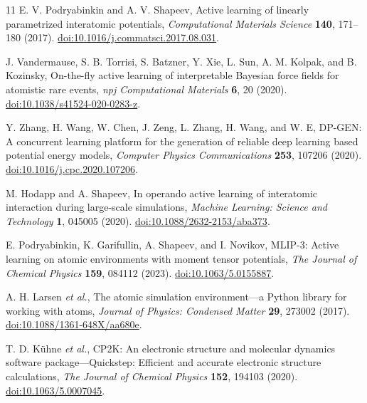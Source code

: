 \begin{thebibliography}{11}
E. V. Podryabinkin and A. V. Shapeev,
Active learning of linearly parametrized interatomic potentials,
\emph{Computational Materials Science} \textbf{140}, 171--180 (2017).
\href{https://doi.org/10.1016/j.commatsci.2017.08.031}{doi:10.1016/j.commatsci.2017.08.031}.

J. Vandermause, S. B. Torrisi, S. Batzner, Y. Xie, L. Sun,
A. M. Kolpak, and B. Kozinsky,
On-the-fly active learning of interpretable Bayesian force fields for
atomistic rare events,
\emph{npj Computational Materials} \textbf{6}, 20 (2020).
\href{https://doi.org/10.1038/s41524-020-0283-z}{doi:10.1038/s41524-020-0283-z}.

Y. Zhang, H. Wang, W. Chen, J. Zeng, L. Zhang, H. Wang, and W. E,
DP-GEN: A concurrent learning platform for the generation of reliable
deep learning based potential energy models,
\emph{Computer Physics Communications} \textbf{253}, 107206 (2020).
\href{https://doi.org/10.1016/j.cpc.2020.107206}{doi:10.1016/j.cpc.2020.107206}.

M. Hodapp and A. Shapeev,
In operando active learning of interatomic interaction during large-scale
simulations,
\emph{Machine Learning: Science and Technology} \textbf{1}, 045005 (2020).
\href{https://doi.org/10.1088/2632-2153/aba373}{doi:10.1088/2632-2153/aba373}.

E. Podryabinkin, K. Garifullin, A. Shapeev, and I. Novikov,
MLIP-3: Active learning on atomic environments with moment tensor potentials,
\emph{The Journal of Chemical Physics} \textbf{159}, 084112 (2023).
\href{https://doi.org/10.1063/5.0155887}{doi:10.1063/5.0155887}.

A. H. Larsen \emph{et al.},
The atomic simulation environment---a Python library for working with atoms,
\emph{Journal of Physics: Condensed Matter} \textbf{29}, 273002 (2017).
\href{https://doi.org/10.1088/1361-648X/aa680e}{doi:10.1088/1361-648X/aa680e}.

T. D. K\"uhne \emph{et al.},
CP2K: An electronic structure and molecular dynamics software package---Quickstep:
Efficient and accurate electronic structure calculations,
\emph{The Journal of Chemical Physics} \textbf{152}, 194103 (2020).
\href{https://doi.org/10.1063/5.0007045}{doi:10.1063/5.0007045}.


\end{thebibliography}
